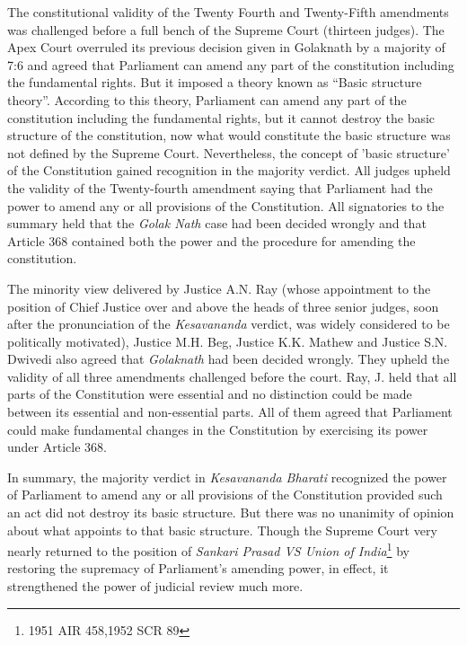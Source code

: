 \begin{multicols}{2}
\noi
The constitutional validity of the Twenty Fourth and Twenty-Fifth amendments was
challenged before a full bench of the Supreme Court (thirteen judges). The Apex Court
overruled its previous decision given in Golaknath by a majority of 7:6 and agreed that
Parliament can amend any part of the constitution including the fundamental rights.
But it imposed a theory known as “Basic structure theory”. According to this theory,
Parliament can amend any part of the constitution including the fundamental rights,
but it cannot destroy the basic structure of the constitution, now what would constitute
the basic structure was not defined by the Supreme Court. Nevertheless, the concept
of 'basic structure' of the Constitution gained recognition in the majority verdict. All
judges upheld the validity of the Twenty-fourth amendment saying that Parliament had
the power to amend any or all provisions of the Constitution. All signatories to the
summary held that the \textit{Golak Nath} case had been decided wrongly and that Article 368
contained both the power and the procedure for amending the constitution.

\noi
{}

\noi
The minority view delivered by Justice A.N. Ray (whose appointment to the position
of Chief Justice over and above the heads of three senior judges, soon after the
pronunciation of the \textit{Kesavananda} verdict, was widely considered to be politically motivated), Justice M.H. Beg, Justice K.K. Mathew and Justice S.N. Dwivedi also
agreed that \textit{Golaknath} had been decided wrongly. They upheld the validity of all three
amendments challenged before the court. Ray, J. held that all parts of the
Constitution were essential and no distinction could be made between its essential and
non-essential parts. All of them agreed that Parliament could make fundamental
changes in the Constitution by exercising its power under Article 368.

\noi
In summary, the majority verdict in \textit{Kesavananda Bharati} recognized the power
of Parliament to amend any or all provisions of the Constitution provided such an act
did not destroy its basic structure. But there was no unanimity of opinion about what
appoints to that basic structure. Though the Supreme Court very nearly returned to the
position of \textit{Sankari Prasad VS Union of India}\footnote{1951 AIR 458,1952 SCR 89} by restoring the supremacy of
Parliament's amending power, in effect, it strengthened the power of judicial review
much more.


\end{multicols}
